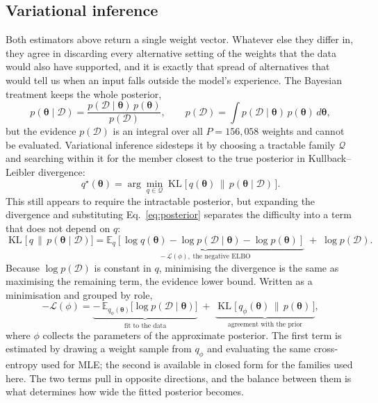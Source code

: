 \documentclass{article}
\begin{document}
\subsection{Variational inference}
\label{sec:vi}

Both estimators above return a single weight vector. Whatever else they differ
in, they agree in discarding every alternative setting of the weights that the
data would also have supported, and it is exactly that spread of alternatives
that would tell us when an input falls outside the model's experience. The
Bayesian treatment keeps the whole posterior,
\begin{equation}
p(\boldsymbol{\theta} \mid \mathcal{D})
= \frac{p(\mathcal{D} \mid \boldsymbol{\theta})\, p(\boldsymbol{\theta})}
       {p(\mathcal{D})},
\qquad
p(\mathcal{D}) = \int p(\mathcal{D} \mid \boldsymbol{\theta})\,
                      p(\boldsymbol{\theta}) \, d\boldsymbol{\theta},
\label{eq:posterior}
\end{equation}
but the evidence $p(\mathcal{D})$ is an integral over all $P = 156{,}058$ weights
and cannot be evaluated. Variational inference sidesteps it by choosing a
tractable family $\mathcal{Q}$ and searching within it for the member closest to
the true posterior in Kullback--Leibler divergence:
\begin{equation}
q^\star(\boldsymbol{\theta})
= \arg\min_{q \in \mathcal{Q}}
  \operatorname{KL}\!\big[\, q(\boldsymbol{\theta}) \,\big\|\,
  p(\boldsymbol{\theta} \mid \mathcal{D}) \,\big].
\label{eq:vi-objective}
\end{equation}
This still appears to require the intractable posterior, but expanding the
divergence and substituting Eq.~\eqref{eq:posterior} separates the difficulty
into a term that does not depend on $q$:
\begin{equation}
\operatorname{KL}\!\big[\, q \,\|\, p(\boldsymbol{\theta} \mid \mathcal{D})\big]
= \underbrace{\mathbb{E}_{q}\!\left[\log q(\boldsymbol{\theta})
   - \log p(\mathcal{D} \mid \boldsymbol{\theta})
   - \log p(\boldsymbol{\theta})\right]}_{-\,\mathcal{L}(\phi),
   \;\text{the negative ELBO}}
  \; + \; \log p(\mathcal{D}).
\label{eq:elbo-derivation}
\end{equation}
Because $\log p(\mathcal{D})$ is constant in $q$, minimising the divergence is
the same as maximising the remaining term, the evidence lower bound. Written as
a minimisation and grouped by role,
\begin{equation}
-\mathcal{L}(\phi)
= \underbrace{-\,\mathbb{E}_{q_\phi(\boldsymbol{\theta})}
   \big[\log p(\mathcal{D} \mid \boldsymbol{\theta})\big]}_{\text{fit to the data}}
  \; + \;
  \underbrace{\operatorname{KL}\!\big[\, q_\phi(\boldsymbol{\theta})
   \,\big\|\, p(\boldsymbol{\theta}) \,\big]}_{\text{agreement with the prior}},
\label{eq:elbo}
\end{equation}
where $\phi$ collects the parameters of the approximate posterior. The first
term is estimated by drawing a weight sample from $q_\phi$ and evaluating the
same cross-entropy used for MLE; the second is available in closed form for the
families used here. The two terms pull in opposite directions, and the balance
between them is what determines how wide the fitted posterior becomes.
\end{document}
